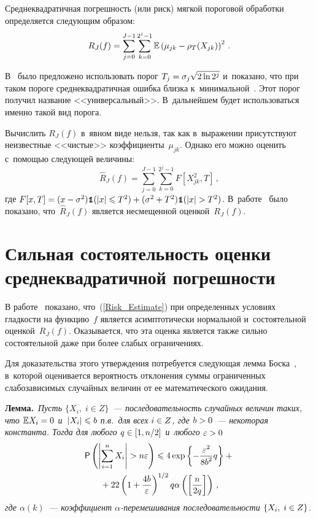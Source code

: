 \begin{multicols}{2}
Среднеквадратичная погрешность (или риск) мягкой пороговой обработки 
определяется следующим образом:
\begin{equation*}
R_J(f)=\sum\limits_{j=0}^{J-1}\sum\limits_{k=0}^{2^j-1}
\mathbb{E}\left(\mu_{jk}-\rho_{T}(X_{jk})\right)^2\,.
\end{equation*}

В~\cite{13-sh1} было предложено использовать порог $T_{j} \hm= 
\sigma_{j}\sqrt{2\ln 2^{j}}$ и~показано, что при таком пороге среднеквадратичная 
ошибка близка к~минимальной~\cite{12-sh1}. Этот порог получил название 
<<универсальный>>. В~дальнейшем будет использоваться именно такой вид порога.

Вычислить $R_J(f)$ в~явном виде нельзя, так как в~выражении присутствуют неизвестные 
<<чистые>> коэффициенты~$\mu_{jk}$. Однако его можно оценить с~по\-мощью 
следующей величины:
\begin{equation}
\widehat{R}_J(f)=\sum\limits_{j=0}^{J-1}\sum\limits_{k=0}^{2^j-1}F\left[X_{jk}^2,T\right]\,,
\label{Risk_Estimate}
\end{equation}
где $F[x,T]=(x-\sigma^2)\Ik(|x|\leqslant T^2)\hm+
(\sigma^2+T^2)\Ik(|x|\hm>T^2)$. В~работе~\cite{1-sh1} 
было показано, что~$\widehat{R}_J(f)$ является несмещенной оценкой~$R_J(f)$.

\section{Сильная состоятельность оценки среднеквадратичной погрешности}

В работе~\cite{9-sh1} показано, что~(\ref{Risk_Estimate}) при определенных 
условиях гладкости на функцию~$f$ является асимптотически нормальной и~состоятельной 
оценкой~$R_J(f)$. Оказывается, что эта оценка является также сильно состоятельной 
даже при более слабых ограничениях.

Для доказательства этого утверждения потребуется следующая лемма Боска~\cite{14-sh1}, 
в~которой оценивается вероятность отклонения суммы ограниченных слабозависимых 
случайных величин от ее математического ожидания.

\smallskip

\noindent
\textbf{Лемма.}\ \textit{Пусть $\{X_i,\;i\in Z\}$~--- 
последовательность случайных величин таких, что $\Expect X_i\hm=0$ 
и~$\left\vert X_i\right\vert\leqslant b$ п.в.\ для всех $i\hm\in Z$, где $b\hm>0$~--- 
некоторая константа. Тогда для любого $q\hm\in[1,n/2]$ и~любого $\eps\hm>0$
\begin{multline}
{\sf P}\left(\left\vert\sum\limits_{i=1}^n X_i\right\vert>n\varepsilon\right)\leqslant 
4\exp\left\{-\displaystyle\frac{\displaystyle \varepsilon^2\mathstrut}{\displaystyle 8b^2\mathstrut}q\right\}+{}\\
{}+22\left(1+\displaystyle\frac{\displaystyle 4b\mathstrut}{\displaystyle \varepsilon\mathstrut}\right)^{1/2}
q\alpha\left(\left[\displaystyle\frac{\displaystyle n\mathstrut}{\displaystyle 2q\mathstrut}\right]\right)\,,
\label{Bosq_inequality}
\end{multline}
где $\alpha(k)$~--- коэффициент $\alpha$-пе\-ре\-ме\-ши\-ва\-ния последовательности
 $\{X_i,\;i\hm\in Z\}$.}
 

\end{multicols}
